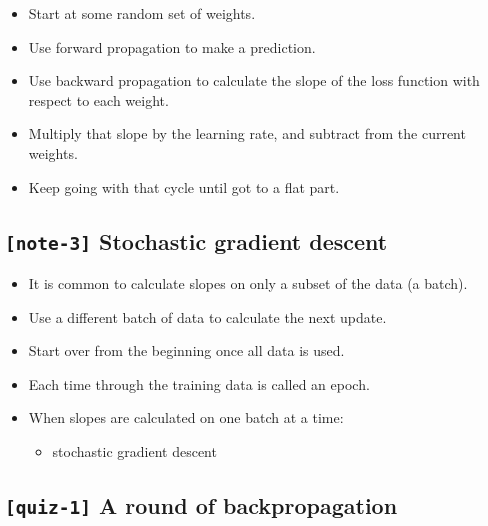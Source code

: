 \documentclass[11pt, twoside]{article}
\providecommand{\tightlist}{%
      \setlength{\itemsep}{0pt}\setlength{\parskip}{0pt}}
\begin{document}
\begin{itemize}
\item
  Start at some random set of weights.
\item
  Use forward propagation to make a prediction.
\item
  Use backward propagation to calculate the slope of the loss function
  with respect to each weight.
\item
  Multiply that slope by the learning rate, and subtract from the
  current weights.
\item
  Keep going with that cycle until got to a flat part.
\end{itemize}

    \hypertarget{note-3-stochastic-gradient-descent}{%
\subsection{\texorpdfstring{\texttt{{[}note-3{]}} Stochastic gradient
descent}{{[}note-3{]} Stochastic gradient descent}}\label{note-3-stochastic-gradient-descent}}

\begin{itemize}
\item
  It is common to calculate slopes on only a subset of the data (a
  batch).
\item
  Use a different batch of data to calculate the next update.
\item
  Start over from the beginning once all data is used.
\item
  Each time through the training data is called an epoch.
\item
  When slopes are calculated on one batch at a time:

  \begin{itemize}
  \tightlist
  \item
    stochastic gradient descent
  \end{itemize}
\end{itemize}

    \hypertarget{quiz-1-a-round-of-backpropagation}{%
\subsection{\texorpdfstring{\texttt{{[}quiz-1{]}} A round of
backpropagation}{{[}quiz-1{]} A round of backpropagation}}\label{quiz-1-a-round-of-backpropagation}}
\end{document}
